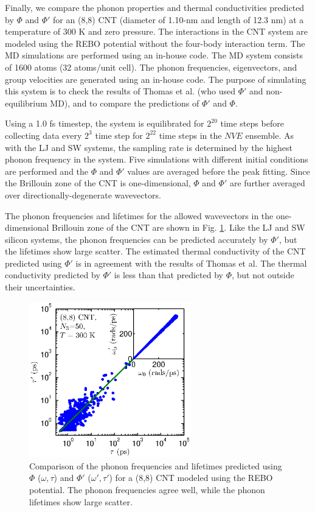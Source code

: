 \documentclass[12pt,twocolumn,iop]{/usr/share/texmf-texlive/tex/latex/iop/iopart}[/usr/share/texmf-texlive/tex/latex/iop/]
\begin{document}
Finally, we compare the phonon properties and thermal conductivities predicted by $\Phi$ and $\Phi'$ for an (8,8) CNT (diameter of 1.10-nm and length of 12.3 nm) at a temperature of $300$ K and zero pressure.\cite{thomas2010c} The interactions in the CNT system are modeled using the REBO potential without the four-body interaction term.\cite{brenner2002} The MD simulations are performed using an in-house code. The MD system consists of 1600 atoms (32 atoms/unit cell). The phonon frequencies, eigenvectors, and group velocities are generated using an in-house code. The purpose of simulating this system is to check the results of Thomas et al.\cite{thomas2010c} (who used $\Phi'$ and non-equilibrium MD), and to compare the predictions of $\Phi'$ and $\Phi$.

Using a 1.0 fs timestep, the system is equilibrated for $2^{20}$ time steps before collecting data every $2^3$ time step for $2^{22}$ time steps in the $NVE$ ensemble.\cite{mcquarrie2000} As with the LJ and SW systems, the sampling rate is determined by the highest phonon frequency in the system. Five simulations with different initial conditions are performed and the $\Phi$ and $\Phi'$ values are averaged before the peak fitting. Since the Brillouin zone of the CNT is one-dimensional, $\Phi$ and $\Phi'$ are further averaged over directionally-degenerate wavevectors.

The phonon frequencies and lifetimes for the allowed wavevectors in the one-dimensional Brillouin zone of the CNT are shown in Fig. \ref{F:FREQ_LIFE_CNT}. Like the LJ and SW silicon systems, the phonon frequencies can be predicted accurately by $\Phi'$, but the lifetimes show large scatter. The estimated thermal conductivity of the CNT predicted using $\Phi'$ is in agreement with the results of Thomas et al.\cite{thomas2010c} The thermal conductivity predicted by $\Phi'$ is less than that predicted by $\Phi$, but not outside their uncertainties.

\begin{figure}
\begin{center}
\includegraphics[angle=0,width=70.0mm]{figure5.eps}
\vspace*{0mm}
\end{center}
\caption{\label{F:FREQ_LIFE_CNT} Comparison of the phonon frequencies and lifetimes predicted using $\Phi$ ($\omega,\tau$) and $\Phi'$ ($\omega',\tau'$) for a (8,8) CNT modeled using the REBO potential. The phonon frequencies agree well, while the phonon lifetimes show large scatter.}
\end{figure}
\end{document}

